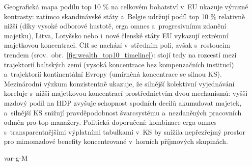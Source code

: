 Geografická mapa podílu top 10 \% na celkovém bohatství v~\ac{EU} ukazuje výrazné kontrasty: zatímco skandinávské státy a~Belgie udržují podíl top 10 \% relativně nižší (díky vysoké odborové hustotě, erga omnes a~progresivnímu zdanění majetku), Litva, Lotyšsko nebo i~nové členské státy \ac{EU} vykazují extrémní majetkovou koncentraci.
ČR se nachází v~středním poli, avšak s~rostoucím trendem (srov.~obr.~\ref{fig:wealth_top10_timeline}): stojí tedy na rozcestí mezi trajektorií baltských zemí (vysoká koncentrace bez kompenzačních institucí) a~trajektorií kontinentální Evropy (umírněná koncentrace se silnou \ac{KS}).
Mezinárodní výzkum konzistentně ukazuje, že silnější kolektivní vyjednávání koreluje s~nižší majetkovou koncentrací prostřednictvím dvou mechanismů: vyšší mzdový podíl na \ac{HDP} zvyšuje schopnost spodních decilů akumulovat majetek, a~silnější \ac{KS} snižují pravděpodobnost švarcsystému a~nezdaněných pracovních odměn pro top manažery.
Politická doporučení: kombinace erga omnes s~transparentnějšími výplatními tabulkami v~\ac{KS} by snížila nepřezřejmý prostor pro mimomzdové benefity koncentrované v~horních příjmových skupinách.

\acs{var-g-M}

